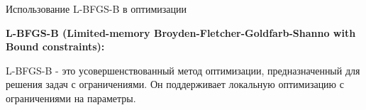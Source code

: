 \documentclass{beamer}
\begin{document}
\begin{frame}{Использование L-BFGS-B в оптимизации}

	\textbf{L-BFGS-B (Limited-memory Broyden-Fletcher-Goldfarb-Shanno with Bound constraints):}

	L-BFGS-B - это усовершенствованный метод оптимизации, предназначенный для решения задач с ограничениями. Он поддерживает локальную оптимизацию с ограничениями на параметры.


\end{frame}
\end{document}
